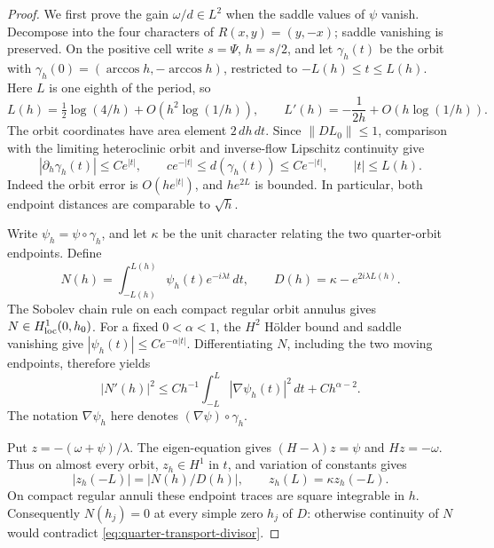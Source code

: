 \documentclass[reqno,11pt]{amsart}
\numberwithin{equation}{section}
\theoremstyle{remark}
\begin{document}
\begin{proof}
We first prove the gain $\omega/d\in L^2$ when the saddle values
of $\psi$ vanish.  Decompose into the four characters of
$R(x,y)=(y,-x)$; saddle vanishing is preserved.  On the
positive cell write $s=\Psi$, $h=s/2$, and let $\gamma_h(t)$ be the orbit with
$\gamma_h(0)=(\arccos h,-\arccos h)$, restricted to
$-L(h)\leq t\leq L(h)$.  Here $L$ is one eighth of the period, so
\[
 L(h)=\tfrac12\log(4/h)+O(h^2\log(1/h)),\qquad
 L'(h)=-\frac1{2h}+O(h\log(1/h)).
\]
The orbit coordinates have area element $2\,dh\,dt$.
Since $\|D L_0\|\leq1$, comparison with the limiting heteroclinic orbit
and inverse-flow Lipschitz continuity give
\begin{equation}
 |\partial_h\gamma_h(t)|\leq Ce^{|t|},\qquad
 ce^{-|t|}\leq d(\gamma_h(t))\leq Ce^{-|t|},
 \qquad |t|\leq L(h).
 \label{eq:quarter-orbit-bounds}
\end{equation}
Indeed the orbit error is $O(he^{|t|})$, and $he^{2L}$ is bounded.
In particular, both endpoint distances are comparable to $\sqrt h$.

Write $\psi_h=\psi\circ\gamma_h$, and let $\kappa$ be the unit
character relating the two quarter-orbit endpoints.  Define
\[
 N(h)=\int_{-L(h)}^{L(h)}\psi_h(t)e^{-i\lambda t}\,dt,
 \qquad D(h)=\kappa-e^{2i\lambda L(h)}.
\]
The Sobolev chain rule on each compact regular orbit annulus gives
$N\in H^1_{\rm loc}(0,h_0)$.  For a fixed $0<\alpha<1$, the
$H^2$ H\"older bound and saddle vanishing give
$|\psi_h(t)|\leq Ce^{-\alpha|t|}$.  Differentiating $N$, including
the two moving endpoints, therefore yields
\begin{equation}
 |N'(h)|^2\leq Ch^{-1}\int_{-L}^{L}|\nabla\psi_h(t)|^2\,dt
                 +Ch^{\alpha-2}.
 \label{eq:first-numerator-estimate}
\end{equation}
The notation $\nabla\psi_h$ here denotes $(\nabla\psi)\circ\gamma_h$.

Put $z=-(\omega+\psi)/\lambda$.  The eigen-equation gives
$(H-\lambda)z=\psi$ and $Hz=-\omega$.  Thus on almost every orbit,
$z_h\in H^1$ in $t$, and variation of constants gives
\begin{equation}
 |z_h(-L)|=|N(h)/D(h)|,\qquad z_h(L)=\kappa z_h(-L).
 \label{eq:quarter-transport-divisor}
\end{equation}
On compact regular annuli these endpoint traces are square
integrable in $h$.  Consequently $N(h_j)=0$ at every simple zero
$h_j$ of $D$: otherwise continuity of $N$ would contradict
\eqref{eq:quarter-transport-divisor}.


\end{proof}
\end{document}
